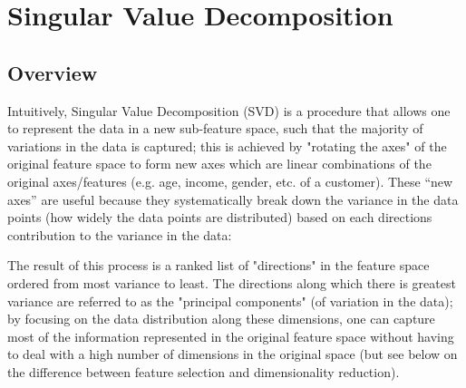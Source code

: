 \documentclass{article}
\begin{document}
\section{Singular Value Decomposition}
\subsection{Overview}
Intuitively, Singular Value Decomposition (SVD) is a procedure that allows one to represent the data in a new sub-feature space, such that the majority of variations in the data is captured; this is achieved by "rotating the axes" of the original feature space to form new axes which are linear combinations of the original axes/features (e.g. age, income, gender, etc. of a customer). These “new axes” are useful because they systematically break down the variance in the data points (how widely the data points are distributed) based on each directions contribution to the variance in the data:

% 
% 

The result of this process is a ranked list of "directions" in the feature space ordered from most variance to least.  The directions along which there is greatest variance are referred to as the "principal components" (of variation in the data); by focusing on the data distribution along these dimensions, one can capture most of the information represented in the original feature space without having to deal with a high number of dimensions in the original space (but see below on the difference between feature selection and dimensionality reduction).
\end{document}
